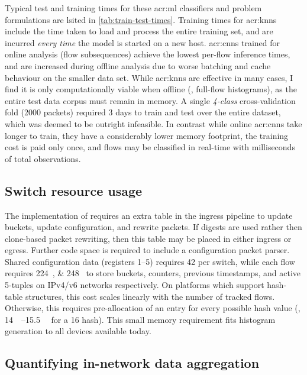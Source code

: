 Typical test and training times for these \gls{acr:ml} classifiers and problem formulations are lsited in \cref{tab:train-test-times}.
Training times for \glspl{acr:knn} include the time taken to load and process the entire training set, and are incurred \emph{every time} the model is started on a new host.
\glspl{acr:cnn} trained for online analysis (flow subsequences) achieve the lowest per-flow inference times, and are increased during offline analysis due to worse batching and cache behaviour on the smaller data set.
While \glspl{acr:knn} are effective in many cases, I find it is only computationally viable when offline (\ie, full-flow histograms), as the entire test data corpus must remain in memory.
A single \emph{4-class} cross-validation fold (\num{2000} packets) required 3 days to train and test over the entire dataset, which was deemed to be outright infeasible.
In contrast while online \glspl{acr:cnn} take longer to train, they have a considerably lower memory footprint, the training cost is paid only once, and flows may be classified in real-time with milliseconds of total observations.

\subsection{Switch resource usage}
The implementation of \seidr{} requires an extra table in the ingress pipeline to update buckets, update configuration, and rewrite packets.
If digests are used rather then clone-based packet rewriting, then this table may be placed in either ingress or egress.
Further code space is required to include a configuration packet parser.
Shared configuration data (registers \numrange{1}{5}) requires \qty{42}{\byte} per switch, while each flow requires \qtylist{224;248}{\byte} to store buckets, counters, previous timestamps, and active 5-tuples on IPv4/v6 networks respectively.
On platforms which support hash-table structures, this cost scales linearly with the number of tracked flows.
Otherwise, this requires pre-allocation of an entry for every possible hash value (\eg, \qtyrange{14}{15.5}{\mebi\byte} for a \qty{16}{\bit} hash). This small memory requirement fits histogram generation to all devices available today.

\subsection{Quantifying in-network data aggregation}

